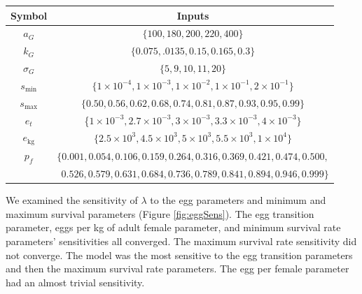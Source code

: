 \documentclass{article}[12pt]
\begin{document}
\begin{table}[htbp]
   \centering
{} %
   \begin{tabular}{@{} c c@{}} %
      \toprule
      Symbol   & Inputs \\
      \midrule
\(a_G\) & \(\{100, 180, 200, 220, 400\}\) \\
\(k_G\)   & \(\{ 0.075, .0135, 0.15, 0.165, 0.3 \}\)\\
\(\sigma_G\)   & \(\{5, 9, 10, 11, 20\}\)\\
 \cmidrule(r){1-2}
\(s_\text{min}\) & \(\{ 1\times10^{-4}, 1\times10^{-3}, 1\times10^{-2}, 1\times10^{-1}, 2\times10^{-1}\}\) \\
\(s_\text{max}\) & \(\{ 0.50, 0.56, 0.62, 0.68, 0.74, 0.81, 0.87, 0.93, 0.95, 0.99\}\) \\
 \cmidrule(r){1-2}
\(e_t\)  & \{\(1\times10^{-3}, 2.7\times10^{-3}, 3\times10^{-3}, 3.3\times10^{-3}, 4\times10^{-3}\} \)  \\
\cmidrule(r){1-2}
 \(e_\text{kg}\) & \(\{2.5\times10^{3}, 4.5\times10^{3}, 5\times10^{3}, 5.5\times10^{3}, 1\times10^{4} \}\) \\
   \midrule
  \(p_f\) & \(\{0.001, 0.054, 0.106, 0.159, 0.264, 0.316, 0.369, 0.421, 0.474, 0.500,\)  \\ 
            & \(\ \ 0.526, 0.579, 0.631, 0.684, 0.736, 0.789, 0.841, 0.894, 0.946, 0.999 \}\) \\ 
      \bottomrule
   \end{tabular} 
   \label{tab:sensInputs}
\end{table}


We examined the sensitivity of \(\lambda\) to the egg parameters and minimum and maximum survival parameters (Figure \ref{fig:eggSens}).
The egg transition parameter, eggs per kg of adult female parameter, and minimum survival rate parameters' sensitivities all converged.
The  maximum survival rate sensitivity did not converge.
The model was the most sensitive to the egg transition parameters and then the maximum survival rate parameters. 
The egg per female parameter had an almost trivial sensitivity.
  
\end{document}
